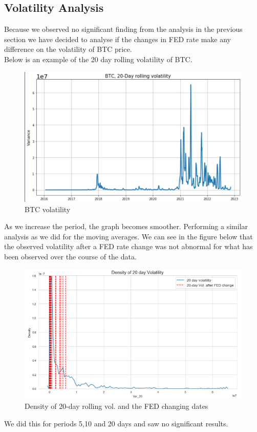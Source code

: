 \documentclass[12pt]{article}
\begin{document}
\subsection{Volatility Analysis}
Because we observed no significant finding from the analysis in the previous section we have decided to analyse if the changes in FED rate make any difference on the volatility of BTC price.\\
Below is an example of the 20 day rolling volatility of BTC.
\begin{figure}[H]
   \includegraphics[scale=0.6]{research_project/text/paper/6.png}
   \centering
   \caption{BTC volatility}
   \label{fig:FED Rate evolution 2016 - 2022}
\end{figure}

As we increase the period, the graph becomes smoother.
\newline
Performing a similar analysis as we did for the moving averages. We can see in the figure below that the observed volatility after a FED rate change was not abnormal for what has been observed over the course of the data.
\begin{figure}[H]
   \includegraphics[scale=0.6]{research_project/text/paper/image1.png}
   \centering
   \caption{Density of 20-day rolling vol. and the FED changing dates }
   \label{fig:rolling_vol20}
\end{figure}
We did this for periods 5,10 and 20 days and saw no significant results.
\end{document}
